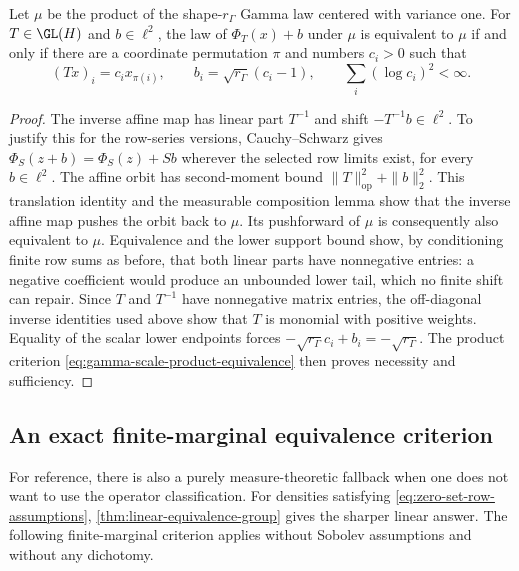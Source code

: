 \begin{corollary}
\label{cor:affine-gamma-classification}
Let \(\mu\) be the product of the shape-\(r_\Gamma\) Gamma law centered with
variance one.
For \(T\in\GL(H)\) and \(b\in\ell^2\), the law of
\(\Phi_T(x)+b\) under \(\mu\) is equivalent to \(\mu\) if and only if
there are a coordinate
permutation \(\pi\) and numbers \(c_i>0\) such that
\[
 (Tx)_i=c_ix_{\pi(i)},\qquad
 b_i=\sqrt{r_\Gamma}(c_i-1),\qquad
 \sum_i(\log c_i)^2<\infty.
\]
\end{corollary}
\begin{proof}
The inverse affine map has linear part \(T^{-1}\) and shift
\(-T^{-1}b\in\ell^2\).
To justify this for the row-series versions, Cauchy--Schwarz gives
\(\Phi_S(z+b)=\Phi_S(z)+Sb\) wherever the selected row limits exist,
for every \(b\in\ell^2\).
The affine orbit has second-moment bound
\(\|T\|_{\mathrm{op}}^2+\|b\|_2^2\).
This translation identity and the measurable composition lemma show
that the inverse affine map pushes the orbit back to \(\mu\).
Its pushforward of \(\mu\) is consequently also equivalent to \(\mu\).
Equivalence and the lower support bound show, by conditioning
finite row sums as before, that both linear parts have nonnegative
entries: a negative coefficient would produce an unbounded lower
tail, which no finite shift can repair.
Since \(T\) and \(T^{-1}\) have nonnegative matrix entries, the
off-diagonal inverse identities used above show that \(T\) is monomial
with positive weights.
Equality of the scalar lower endpoints forces
\(-\sqrt{r_\Gamma}c_i+b_i=-\sqrt{r_\Gamma}\).
The product criterion \eqref{eq:gamma-scale-product-equivalence}
then proves necessity and sufficiency.
\end{proof}

\subsection{An exact finite-marginal equivalence criterion}
\label{sec:finite-marginal-equivalence-criterion}

For reference, there is also a purely measure-theoretic fallback when one
does not want to use the operator classification.
For densities satisfying \eqref{eq:zero-set-row-assumptions},
\cref{thm:linear-equivalence-group} gives the sharper linear answer.
The following finite-marginal criterion applies without Sobolev assumptions
and without any dichotomy.

